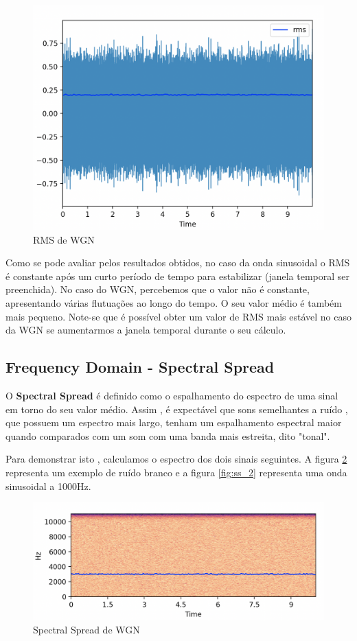 \begin{figure}[H]
    \centering
    \includegraphics[width=.8\linewidth]{figs/image_2.png}
    \caption{RMS de WGN}
    \label{fig:rms_2}
\end{figure}

Como se pode avaliar pelos resultados obtidos, no caso da onda sinusoidal o RMS é constante após um curto período de tempo para estabilizar (janela temporal ser preenchida).
No caso do WGN, percebemos que o valor não é constante, apresentando várias flutuações ao longo do tempo. O seu valor médio é também mais pequeno.
Note-se que é possível obter um valor de RMS mais estável no caso da WGN se aumentarmos a janela temporal durante o seu cálculo.



\subsection{Frequency Domain - Spectral Spread}
O \textbf{Spectral Spread} é definido como o espalhamento do espectro de uma sinal em torno do seu valor médio.
Assim , é expectável que sons semelhantes a ruído , que possuem um espectro mais largo, tenham um espalhamento espectral maior quando comparados com um som com uma banda mais estreita, dito "tonal". \cite{spec_features}

Para demonstrar isto , calculamos o espectro dos dois sinais seguintes. A figura \ref{fig:ss_1} representa um exemplo de ruído branco e a figura \ref{fig:ss_2} representa uma onda sinusoidal a 1000Hz.
\begin{figure}[H]
    \centering
    \includegraphics[width=.8\linewidth]{figs/image_3.png}
    \caption{Spectral Spread de WGN}
    \label{fig:ss_1}
\end{figure}

